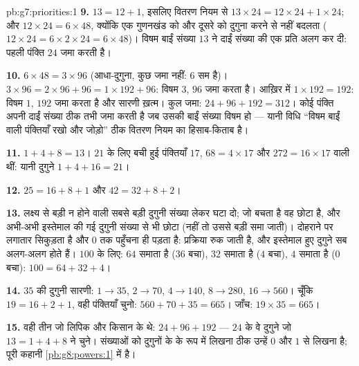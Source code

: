 \begin{solution}{pb:g7:priorities:1}
\textbf{9.} $13 = 12 + 1$, इसलिए वितरण नियम से
$13 \times 24 = 12 \times 24 + 1 \times 24$; और
$12 \times 24 = 6 \times 48$, क्योंकि एक गुणनखंड को  और दूसरे
को दुगुना करने से  नहीं बदलता
($12 \times 24 = 6 \times 2 \times 24 = 6 \times 48$)। विषम
बाईं संख्या $13$ ने दाईं संख्या की एक प्रति अलग कर दी: पहली
पंक्ति $24$ जमा करती है।

\textbf{10.} $6 \times 48 = 3 \times 96$ (आधा-दुगुना, कुछ जमा
नहीं: $6$ सम है)। $3 \times 96 = 2 \times 96 + 96 =
1 \times 192 + 96$: विषम $3$, $96$ जमा करता है। आख़िर में
$1 \times 192 = 192$: विषम $1$, $192$ जमा करता है और सारणी
ख़त्म। कुल जमा: $24 + 96 + 192 = 312$। कोई पंक्ति अपनी दाईं
संख्या ठीक तभी जमा करती है जब उसकी बाईं संख्या विषम हो --- यानी
विधि ``विषम बाईं वाली पंक्तियाँ रखो और जोड़ो'' ठीक वितरण नियम का
हिसाब-किताब है।

\textbf{11.} $1 + 4 + 8 = 13$। $21$ के लिए बची हुई पंक्तियाँ
$17$, $68 = 4 \times 17$ और $272 = 16 \times 17$ वाली थीं: यानी
दुगुने $1 + 4 + 16 = 21$।

\textbf{12.} $25 = 16 + 8 + 1$ और $42 = 32 + 8 + 2$।

\textbf{13.} लक्ष्य से बड़ी न होने वाली सबसे बड़ी दुगुनी संख्या
लेकर घटा दो; जो बचता है वह छोटा है, और अभी-अभी इस्तेमाल की गई
दुगुनी संख्या से भी छोटा (नहीं तो उससे बड़ी समा जाती)। दोहराने
पर  लगातार सिकुड़ता है और $0$ तक पहुँचना ही पड़ता है:
प्रक्रिया रुक जाती है, और इस्तेमाल हुए दुगुने सब अलग-अलग होते
हैं। $100$ के लिए: $64$ समाता है ($36$ बचा), $32$ समाता है
($4$ बचा), $4$ समाता है ($0$ बचा): $100 = 64 + 32 + 4$।

\textbf{14.} $35$ की दुगुनी सारणी: $1 \to 35$, $2 \to 70$,
$4 \to 140$, $8 \to 280$, $16 \to 560$। चूँकि
$19 = 16 + 2 + 1$, वही पंक्तियाँ चुनो:
$560 + 70 + 35 = 665$। जाँच: $19 \times 35 = 665$।

\textbf{15.} वही तीन जो लिपिक और किसान के थे:
$24 + 96 + 192$ --- $24$ के वे दुगुने जो
$13 = 1 + 4 + 8$ ने चुने। संख्याओं को दुगुनों के  के रूप
में लिखना ठीक उन्हें $0$ और $1$ से लिखना है; पूरी कहानी
\cref{pb:g8:powers:1} में है।

\end{solution}

